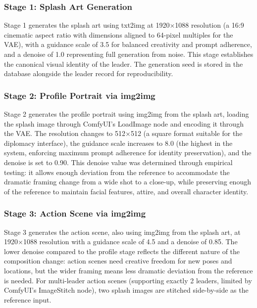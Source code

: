 \documentclass[conference]{IEEEtran}
\begin{document}
\subsubsection{Stage 1: Splash Art Generation}

Stage 1 generates the splash art using txt2img at 1920$\times$1088 resolution (a 16:9 cinematic aspect ratio with dimensions aligned to 64-pixel multiples for the VAE), with a guidance scale of 3.5 for balanced creativity and prompt adherence, and a denoise of 1.0 representing full generation from noise. This stage establishes the canonical visual identity of the leader. The generation seed is stored in the database alongside the leader record for reproducibility.

\subsubsection{Stage 2: Profile Portrait via img2img}

Stage 2 generates the profile portrait using img2img from the splash art, loading the splash image through ComfyUI's LoadImage node and encoding it through the VAE. The resolution changes to 512$\times$512 (a square format suitable for the diplomacy interface), the guidance scale increases to 8.0 (the highest in the system, enforcing maximum prompt adherence for identity preservation), and the denoise is set to 0.90. This denoise value was determined through empirical testing: it allows enough deviation from the reference to accommodate the dramatic framing change from a wide shot to a close-up, while preserving enough of the reference to maintain facial features, attire, and overall character identity.

\subsubsection{Stage 3: Action Scene via img2img}

Stage 3 generates the action scene, also using img2img from the splash art, at 1920$\times$1088 resolution with a guidance scale of 4.5 and a denoise of 0.85. The lower denoise compared to the profile stage reflects the different nature of the composition change: action scenes need creative freedom for new poses and locations, but the wider framing means less dramatic deviation from the reference is needed. For multi-leader action scenes (supporting exactly 2 leaders, limited by ComfyUI's ImageStitch node), two splash images are stitched side-by-side as the reference input.
\end{document}

